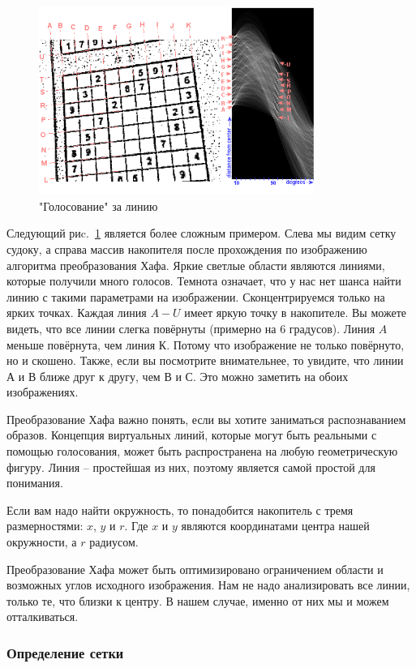 \begin{figure}[ht!]
  \centering
  \includegraphics[width=0.8\textwidth]{inc/raster/design2-7.png}
  \caption{"Голосование" за линию}
  \label{fig:fig27}
\end{figure}
Следующий риc.~\ref{fig:fig27} является более сложным примером. Слева мы видим сетку судоку, а справа массив накопителя после прохождения по изображению алгоритма преобразования Хафа. Яркие светлые области являются линиями, которые получили много голосов. Темнота означает, что у нас нет шанса найти линию с такими параметрами на изображении. Сконцентрируемся только на ярких точках. Каждая линия $A-U$ имеет яркую точку в накопителе. Вы можете видеть, что все линии слегка повёрнуты (примерно на 6 градусов). Линия $A$ меньше повёрнута, чем линия $К$. Потому что изображение не только повёрнуто, но и скошено. Также, если вы посмотрите внимательнее, то увидите, что линии $А$ и $В$ ближе друг к другу, чем $В$ и $С$. Это можно заметить на обоих изображениях.

Преобразование Хафа важно понять, если вы хотите заниматься распознаванием образов. Концепция виртуальных линий, которые могут быть реальными с помощью голосования, может быть распространена на любую геометрическую фигуру. Линия – простейшая из них, поэтому является самой простой для понимания. 

Если вам надо найти окружность, то понадобится накопитель с тремя размерностями: $x$, $y$ и $r$. Где $x$ и $y$ являются координатами центра нашей окружности, а $r$ радиусом.

Преобразование Хафа может быть оптимизировано ограничением области и возможных углов исходного изображения. Нам не надо анализировать все линии, только те, что близки к центру. В нашем случае, именно от них мы и можем отталкиваться.

\subsubsection{Определение сетки}

